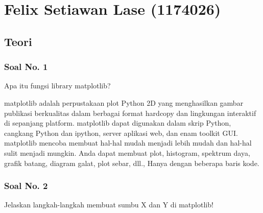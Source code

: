 \section{Felix Setiawan Lase (1174026)}
\subsection{Teori}
\subsubsection{Soal No. 1}
\hfill \break
Apa itu fungsi library matplotlib?

\hfill \break
matplotlib adalah perpustakaan plot Python 2D yang menghasilkan gambar publikasi berkualitas dalam berbagai format hardcopy dan lingkungan interaktif di sepanjang platform. matplotlib dapat digunakan dalam skrip Python, cangkang Python dan ipython, server aplikasi web, dan enam toolkit GUI. matplotlib mencoba membuat hal-hal mudah menjadi lebih mudah dan hal-hal sulit menjadi mungkin. Anda dapat membuat plot, histogram, spektrum daya, grafik batang, diagram galat, plot sebar, dll., Hanya dengan beberapa baris kode.

\subsubsection{Soal No. 2}
\hfill \break
Jelaskan langkah-langkah membuat sumbu X dan Y di matplotlib!

